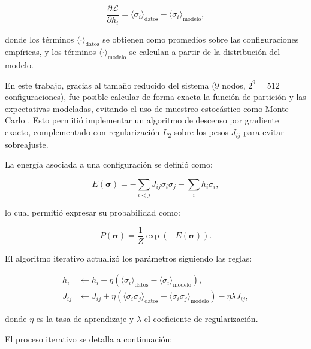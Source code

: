 \[
\frac{\partial \mathcal{L}}{\partial h_i} = \langle \sigma_i \rangle_{\text{datos}} - \langle \sigma_i \rangle_{\text{modelo}},
\]

donde los términos \( \langle \cdot \rangle_{\text{datos}} \) se 
obtienen como promedios sobre las configuraciones empíricas, y 
los términos \( \langle \cdot \rangle_{\text{modelo}} \) se 
calculan a partir de la distribución del modelo.

En este trabajo, gracias al tamaño reducido del sistema (9 
nodos, \(2^9 = 512\) configuraciones), fue posible calcular de 
forma exacta la función de partición y las expectativas 
modeladas, evitando el uso de muestreo estocástico como Monte 
Carlo \cite{pena2001deduccion}. Esto permitió implementar un algoritmo de descenso por 
gradiente exacto, complementado con regularización \(L_2\) sobre 
los pesos \( J_{ij} \) para evitar sobreajuste.

La energía asociada a una configuración se definió como:

\[
E(\boldsymbol{\sigma}) = -\sum_{i<j} J_{ij} \sigma_i \sigma_j - \sum_i h_i \sigma_i,
\]

lo cual permitió expresar su probabilidad como:

\[
P(\boldsymbol{\sigma}) = \frac{1}{Z} \exp\left(-E(\boldsymbol{\sigma})\right).
\]

El algoritmo iterativo actualizó los parámetros siguiendo las 
reglas:

\begin{align}
    h_i &\leftarrow h_i + \eta \left( \langle \sigma_i \rangle_{\text{datos}} - \langle \sigma_i \rangle_{\text{modelo}} \right), \\
    J_{ij} &\leftarrow J_{ij} + \eta \left( \langle \sigma_i \sigma_j \rangle_{\text{datos}} - \langle \sigma_i \sigma_j \rangle_{\text{modelo}} \right) - \eta \lambda J_{ij},
\end{align}

donde \( \eta \) es la tasa de aprendizaje y \( \lambda \) el 
coeficiente de regularización.


El proceso iterativo se detalla a continuación:

